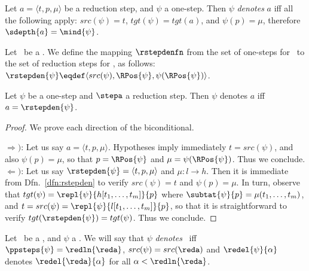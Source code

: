 

\begin{definition}
\label{dfn:redstep-denotation}
Let $a = \langle t, p, \mu \rangle$ be a reduction step, and $\psi$ a one-step. 
Then $\psi$ \emph{denotes} $a$ iff all the following apply: $src(\psi) = t$, $tgt(\psi) = tgt(a)$, and $\psi(p) = \mu$, therefore $\sdepth{a} = \mind{\psi}$.
\end{definition}

\begin{definition}
\label{dfn:rstepden}
Let \trst\ be a \TRS. We define the mapping $\rstepdenfn$ from the set of one-steps for \trst\ to the set of reduction steps for \trst, as follows: 
$\rstepden{\psi} \eqdef \langle src(\psi), \RPos{\psi}, \psi(\RPos{\psi}) \rangle$.
\end{definition}

\begin{lemma}
\label{rsl:rstepden-denotes}
Let $\psi$ be a one-step and $\stepa$ a reduction step. 
Then $\psi$ denotes $a$ iff $a = \rstepden{\psi}$.
\end{lemma}

\begin{proof}
We prove each direction of the biconditional. 

\noindent
$\Rightarrow )$:
Let us say $a = \langle t, p, \mu \rangle$. Hypotheses imply immediately $t = src(\psi)$, and also $\psi(p) = \mu$, so that $p = \RPos{\psi}$ and $\mu = \psi(\RPos{\psi})$. Thus we conclude.
\noindent
$\Leftarrow )$:
Let us say $\rstepden{\psi} = \langle t, p, \mu \rangle$ and $\mu: l \to h$.
Then it is immediate from Dfn.~\ref{dfn:rstepden} to verify $src(\psi) = t$ and $\psi(p) = \mu$.
In turn, observe that $tgt(\psi) = \repl{\psi}{h[t_1, \ldots, t_m]}{p}$ where $\subtat{\psi}{p} = \mu(t_1, \ldots, t_m)$, and
$t = src(\psi) = \repl{\psi}{l[t_1, \ldots, t_m]}{p}$, so that it is straightforward to verify $tgt(\rstepden{\psi}) = tgt(\psi)$. Thus we conclude.
\end{proof}



\begin{definition}
\label{dfn:redseq-denotation}
Let \reda\ be a \redseq, and $\psi$ a \pnpterm. 
We will say that $\psi$ \emph{denotes} \reda\ iff $\ppsteps{\psi} = \redln{\reda}$, $src(\psi) = src(\reda)$ and $\redel{\psi}{\alpha}$ denotes $\redel{\reda}{\alpha}$ for all $\alpha < \redln{\reda}$.
\end{definition}


